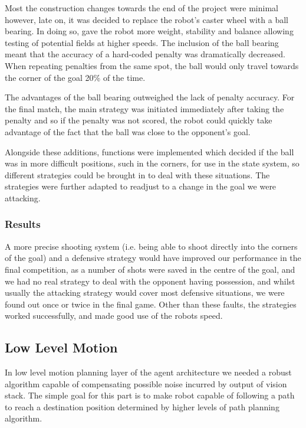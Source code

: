 Most the construction changes towards the end of the project were minimal however, late on, it was decided to replace the robot's caster wheel with a ball bearing. In doing so, gave the robot more weight, stability and balance allowing testing of potential fields at higher speeds. The inclusion of the ball bearing meant that the accuracy of a hard-coded penalty was dramatically decreased. When repeating penalties from the same spot, the ball would only travel towards the corner of the goal 20\% of the time.\linebreak

The advantages of the ball bearing outweighed the lack of penalty accuracy. For the final match, the main strategy was initiated immediately after taking the penalty and so if the penalty was not scored, the robot could quickly take advantage of the fact that the ball was close to the opponent's goal.\linebreak

Alongside these additions, functions were implemented which decided if the ball was in more difficult positions, such in the corners, for use in the state system, so different strategies could be brought in to deal with these situations. The strategies were further adapted to readjust to a change in the goal we were attacking. \linebreak

\subsubsection{Results}
A more precise shooting system (i.e. being able to shoot directly into the corners of the goal) and a defensive strategy would have improved our performance in the final competition, as a number of shots were saved in the centre of the goal, and we had no real strategy to deal with the opponent having possession, and whilst usually the attacking strategy would cover most defensive situations, we were found out once or twice in the final game. Other than these faults, the strategies worked successfully, and made good use of the robots speed.

\subsection{Low Level Motion}
In low level motion planning layer of the agent architecture we needed a robust algorithm capable of compensating possible noise incurred by output of vision stack.  The simple goal for this part is to make robot capable of following a path to reach a destination position determined by higher levels of path planning algorithm.\linebreak

